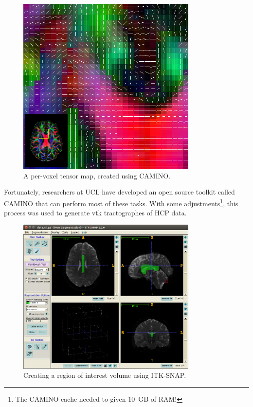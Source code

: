 \documentclass[MSc,paper=a4,pagesize=auto]{icldt}
\begin{document}
\begin{figure}[htbp!]
    \centering
    \includegraphics[width=0.8\textwidth]{resources/CAMINO_tensors}
    \caption{A per-voxel tensor map, created using CAMINO.}
    \label{fig:CAMINO_tensors}
\end{figure}

Fortunately, researchers at UCL have developed an open source toolkit called CAMINO that can perform most of these tasks. With some adjustments\footnote{The CAMINO cache needed to given \SI{10}{GB} of RAM!}, this process was used to generate vtk tractographes of HCP data. 

\begin{figure}[htbp!]
    \centering
    \includegraphics[width=0.8\textwidth]{resources/CAMINO_roi_selection}
    \caption{Creating a region of interest volume using ITK-SNAP.}
    \label{fig:CAMINO_roi_selection}
\end{figure}
\end{document}
